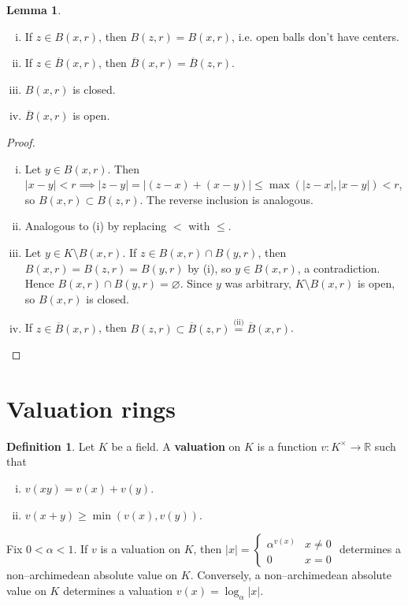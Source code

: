 \documentclass{article}
\theoremstyle{definition}
\newtheorem{lemma}[theorem]{Lemma}
\newtheorem{defn}{Definition}[section]
\begin{document}
\begin{lemma}
    \begin{enumerate}[(i)]
        \item If $z \in B(x,r)$, then $B(z,r) = B(x,r)$, i.e. open balls don't have centers.
        \item If $z \in \overline{B}(x,r)$, then $\overline{B}(x,r) = \overline{B}(z,r)$.
        \item $B(x,r)$ is closed.
        \item $\overline{B}(x,r)$ is open.
    \end{enumerate}
\end{lemma}
\begin{proof}
    \begin{enumerate}[(i)]
        \item Let $y \in B(x,r)$. Then $|x-y|<r \implies |z-y| = |(z-x) + (x-y)| \le \max(|z-x|,|x-y|) < r$, so $B(x,r) \subset B(z,r)$. The reverse inclusion is analogous.
        \item Analogous to (i) by replacing $<$ with $\le$.
        \item Let $y \in K \setminus B(x,r)$. If $z \in B(x,r) \cap B(y,r)$, then $B(x,r) = B(z,r) = B(y,r)$ by (i), so $y \in B(x,r)$, a contradiction. Hence $B(x,r) \cap B(y,r) = \varnothing$. Since $y$ was arbitrary, $K \setminus B(x,r)$ is open, so $B(x,r)$ is closed.
        \item If $z \in \overline{B}(x,r)$, then $B(z,r) \subset \overline{B}(z,r) \stackrel{\text{(ii)}}{=} \overline{B}(x,r)$.
    \end{enumerate}
\end{proof}

\section{Valuation rings}
\begin{defn}
    Let $K$ be a field. A \textbf{valuation} on $K$ is a function $v : K^\times \to \mathbb{R}$ such that 
    \begin{enumerate}[(i)]
        \item $v(xy) = v(x)+v(y)$.
        \item $v(x+y) \ge \min(v(x),v(y))$.
    \end{enumerate}
\end{defn}
Fix $0<\alpha<1$. If $v$ is a valuation on $K$, then $|x| = \begin{cases}
    \alpha^{v(x)} & x \neq 0\\
    0 & x = 0
\end{cases}$
determines a non--archimedean absolute value on $K$. Conversely, a non--archimedean absolute value on $K$ determines a valuation $v(x) = \log_{\alpha} |x|$.
\end{document}
